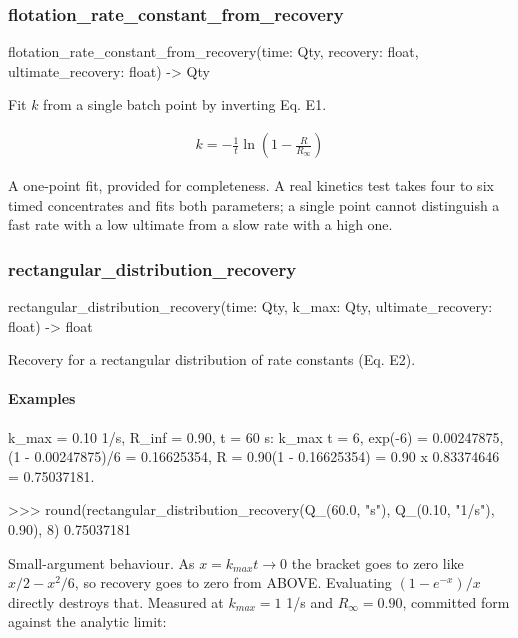 \documentclass[10pt,a4paper,twoside]{report}
\begin{document}
\subsubsection*{flotation\_rate\_constant\_from\_recovery}

\begin{verbatimsmall}
flotation_rate_constant_from_recovery(time: Qty, recovery: float, ultimate_recovery: float) -> Qty
\end{verbatimsmall}

Fit $k$ from a single batch point by inverting Eq. E1.

\begin{equation*}
\begin{gathered}
k = -\frac{1}{t} \ln\left( 1 - \frac{R}{R_{\infty}} \right)
\end{gathered}
\end{equation*}

A one-point fit, provided for completeness. A real kinetics test takes four to six timed concentrates and fits both parameters; a single point cannot distinguish a fast rate with a low ultimate from a slow rate with a high one.

\subsubsection*{rectangular\_distribution\_recovery}

\begin{verbatimsmall}
rectangular_distribution_recovery(time: Qty, k_max: Qty, ultimate_recovery: float) -> float
\end{verbatimsmall}

Recovery for a rectangular distribution of rate constants (Eq. E2).

\paragraph*{Examples}

k\_max = 0.10 1/s, R\_inf = 0.90, t = 60 s: k\_max t = 6, exp(-6) = 0.00247875, (1 - 0.00247875)/6 = 0.16625354, R = 0.90(1 - 0.16625354) = 0.90 x 0.83374646 = 0.75037181.

\begin{doctestblock}
>>> round(rectangular_distribution_recovery(Q_(60.0, "s"), Q_(0.10, "1/s"), 0.90), 8)
0.75037181
\end{doctestblock}

Small-argument behaviour. As $x = k_{max} t \to 0$ the bracket goes to zero like $x/2 - x^2/6$, so recovery goes to zero from ABOVE. Evaluating $(1 - e^{-x})/x$ directly destroys that. Measured at $k_{max} = 1$ 1/s and $R_\infty = 0.90$, committed form against the analytic limit:
\end{document}
